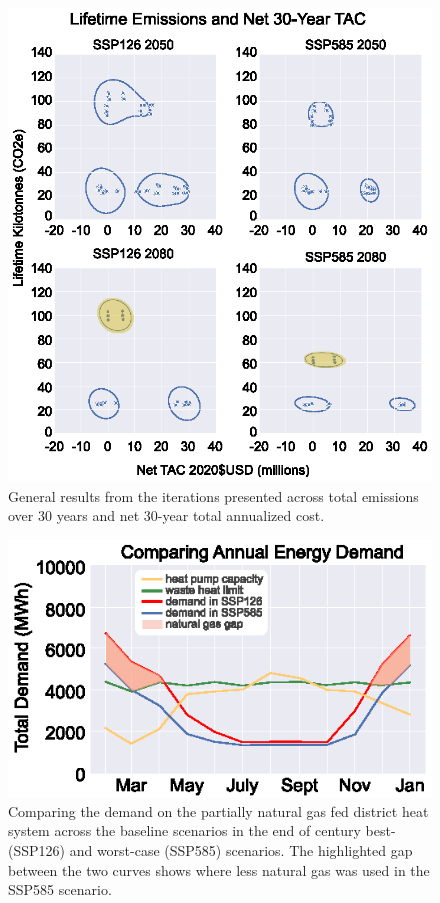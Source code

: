 \documentclass[twocolumn, a4paper,10pt]{article}
\begin{document}
\begin{figure}[t!]
    \centering
    \captionsetup{margin=.5cm}
    \includegraphics[scale=0.8]{figures/general_results_box.eps}
    \caption{General results from the iterations presented across total emissions over 30 years and net 30-year total annualized cost.}
    \label{fig:cross_plot}
\end{figure}

\begin{figure}[t!]
    \centering
    \includegraphics[scale=1.15]{figures/district_heat_charts.eps}
    \caption{Comparing the demand on the partially natural gas fed district heat system across the baseline scenarios in the end of century best- (SSP126) and worst-case (SSP585) scenarios. The highlighted gap between the two curves shows where less natural gas was used in the SSP585 scenario.}
    \label{fig:compare_district}
\end{figure}
\end{document}

